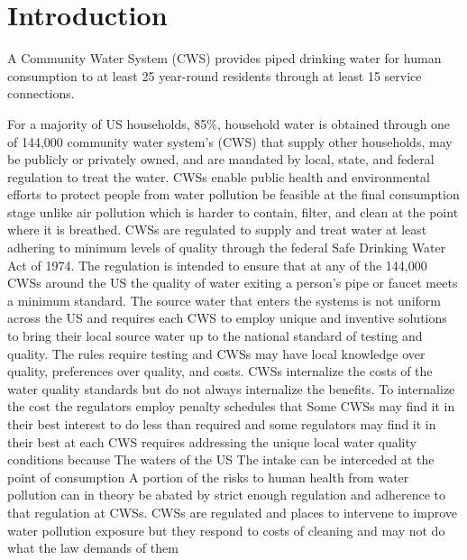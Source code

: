 \documentclass{article}
\begin{document}
\begin{center}
\begin{abstract}
regulators applied discretion in allocating visits and enforcing the SDWA. These results suggest that as mining raises upstream pollution and costs of compliance with the SDWA increase CWSs become more negligent.

\end{abstract}\end{center}
	
\newpage
\doublespacing


\section{Introduction}

A Community Water System (CWS) provides piped drinking water for human consumption to at least 25 year-round residents through at least 15 service connections.

For a majority of US households, 85\%, household water is obtained through one of 144,000 community water system's (CWS) that supply other households, may be publicly or privately owned, and are mandated by local, state, and federal regulation to treat the water. CWSs enable public health and environmental efforts to protect people from water pollution be feasible at the final consumption stage unlike air pollution which is harder to contain, filter, and clean at the point where it is breathed. CWSs are regulated to supply and treat water at least adhering to minimum levels of quality through the federal Safe Drinking Water Act of 1974. The regulation is intended to ensure that at any of the 144,000 CWSs around the US the quality of water exiting a person's pipe or faucet meets a minimum standard. The source water that enters the systems is not uniform across the US and requires each CWS to employ unique and inventive solutions to bring their local source water up to the national standard of testing and quality. The rules require testing and CWSs may have local knowledge over quality, preferences over quality, and costs. CWSs internalize the costs of the water quality standards but do not always internalize the benefits. To internalize the cost the regulators employ penalty schedules that Some CWSs may find it in their best interest to do less than required and some regulators may find it in their best  at each CWS requires addressing the unique local water quality conditions because The waters of the US The intake  can be interceded at the point of consumption A portion of the risks to human health from water pollution can in theory be abated by strict enough regulation and adherence to that regulation at CWSs. CWSs are regulated and places to intervene to improve water pollution exposure but they respond to costs of cleaning and may not do what the law demands of them
\end{document}
